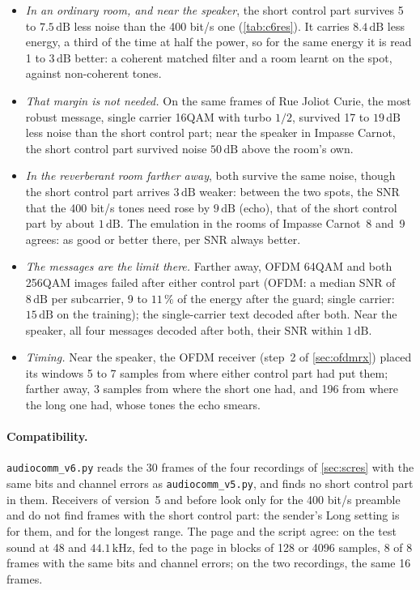 \documentclass[11pt,a4paper]{article}
\newcommand{\kHz}{\,\mathrm{kHz}}
\newcommand{\dB}{\,\mathrm{dB}}
\newcommand{\code}[1]{\texttt{#1}}
\theoremstyle{remark}
\begin{document}
\begin{itemize}
\item \emph{In an ordinary room, and near the speaker}, the short control part survives 5 to $7.5\dB$ less noise than the 400 bit/s one (\cref{tab:c6res}). It carries $8.4\dB$ less energy, a third of the time at half the power, so for the same energy it is read 1 to $3\dB$ better: a coherent matched filter and a room learnt on the spot, against non-coherent tones.
\item \emph{That margin is not needed.} On the same frames of Rue Joliot Curie, the most robust message, single carrier 16QAM with turbo $1/2$, survived 17 to $19\dB$ less noise than the short control part; near the speaker in Impasse Carnot, the short control part survived noise $50\dB$ above the room's own.
\item \emph{In the reverberant room farther away}, both survive the same noise, though the short control part arrives $3\dB$ weaker: between the two spots, the SNR that the 400 bit/s tones need rose by $9\dB$ (echo), that of the short control part by about $1\dB$. The emulation in the rooms of Impasse Carnot~8 and~9 agrees: as good or better there, per SNR always better.
\item \emph{The messages are the limit there.} Farther away, OFDM 64QAM and both 256QAM images failed after either control part (OFDM: a median SNR of $8\dB$ per subcarrier, 9 to $11\,\%$ of the energy after the guard; single carrier: $15\dB$ on the training); the single-carrier text decoded after both. Near the speaker, all four messages decoded after both, their SNR within $1\dB$.
\item \emph{Timing.} Near the speaker, the OFDM receiver (step~2 of \cref{sec:ofdmrx}) placed its windows 5 to 7 samples from where either control part had put them; farther away, 3 samples from where the short one had, and 196 from where the long one had, whose tones the echo smears.
\end{itemize}

\paragraph{Compatibility.}
\code{audiocomm\_v6.py} reads the 30 frames of the four recordings of \cref{sec:scres} with the same bits and channel errors as \code{audiocomm\_v5.py}, and finds no short control part in them. Receivers of version~5 and before look only for the 400 bit/s preamble and do not find frames with the short control part: the sender's Long setting is for them, and for the longest range. The page and the script agree: on the test sound at 48 and $44.1\kHz$, fed to the page in blocks of 128 or 4096 samples, 8 of 8 frames with the same bits and channel errors; on the two recordings, the same 16 frames.
\end{document}
